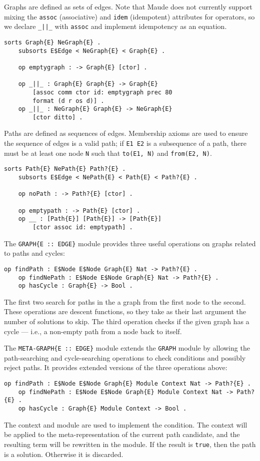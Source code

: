 \documentclass[11pt]{article}
\begin{document}
Graphs are defined as sets of edges. Note that Maude does not currently support
mixing the \lstinline|assoc| (associative) and \lstinline|idem| (idempotent)
attributes for operators, so we declare \lstinline!_||_! with \lstinline|assoc|
and implement idempotency as an equation.
\begin{lstlisting}[language=Maude, style=smalllisting]
    sorts Graph{E} NeGraph{E} .
    subsorts E$Edge < NeGraph{E} < Graph{E} .

    op emptygraph : -> Graph{E} [ctor] .

    op _||_ : Graph{E} Graph{E} -> Graph{E}
        [assoc comm ctor id: emptygraph prec 80
        format (d r os d)] .
    op _||_ : NeGraph{E} Graph{E} -> NeGraph{E}
        [ctor ditto] .
\end{lstlisting}

Paths are defined as sequences of edges. Membership axioms are used to ensure
the sequence of edges is a valid path; if \lstinline|E1 E2| is a subsequence of
a path, there must be at least one node \lstinline|N| such that
\lstinline|to(E1, N)| and \lstinline|from(E2, N)|.
\begin{lstlisting}[language=Maude, style=smalllisting]
    sorts Path{E} NePath{E} Path?{E} .
    subsorts E$Edge < NePath{E} < Path{E} < Path?{E} .

    op noPath : -> Path?{E} [ctor] .

    op emptypath : -> Path{E} [ctor] .
    op __ : [Path{E}] [Path{E}] -> [Path{E}]
        [ctor assoc id: emptypath] .
\end{lstlisting}

The \lstinline|GRAPH{E :: EDGE}| module provides three useful operations on
graphs related to paths and cycles:
\begin{lstlisting}[language=Maude, style=smalllisting]
    op findPath : E$Node E$Node Graph{E} Nat -> Path?{E} .
    op findNePath : E$Node E$Node Graph{E} Nat -> Path?{E} .
    op hasCycle : Graph{E} -> Bool .
\end{lstlisting}
The first two search for paths in the a graph from the first node to the second.
These operations are descent functions, so they take as their last argument the
number of solutions to skip. The third operation checks if the given graph has
a cycle --- i.e., a non-empty path from a node back to itself.

The \lstinline|META-GRAPH{E :: EDGE}| module extends the \lstinline|GRAPH|
module by allowing the path-searching and cycle-searching operations to check
conditions and possibly reject paths. It provides extended versions of the
three operations above:
\begin{lstlisting}[language=Maude, style=smalllisting]
    op findPath : E$Node E$Node Graph{E} Module Context Nat -> Path?{E} .
    op findNePath : E$Node E$Node Graph{E} Module Context Nat -> Path?{E} .
    op hasCycle : Graph{E} Module Context -> Bool .
\end{lstlisting}
The context and module are used to implement the condition. The context will
be applied to the meta-representation of the current path candidate, and the
resulting term will be rewritten in the module. If the result is \lstinline|true|,
then the path is a solution. Otherwise it is discarded.
\end{document}
